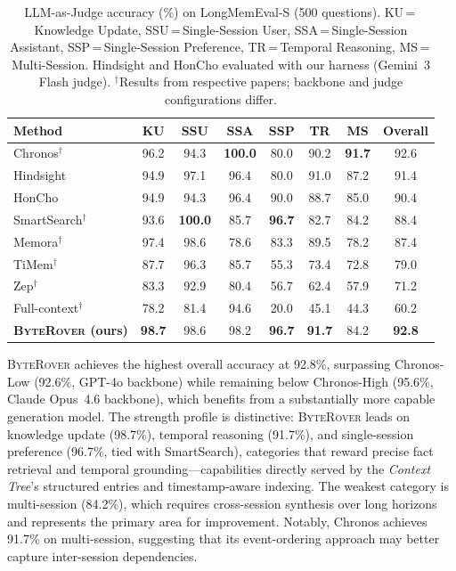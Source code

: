 \documentclass[11pt]{article}
\newcommand{\byterover}{\textsc{ByteRover}}
\newcommand{\contexttree}{\textit{Context Tree}}
\begin{document}
\begin{table}[t]
\centering
\small
\begin{tabular}{@{}lcccccc|c@{}}
\toprule
\textbf{Method} & \textbf{KU} & \textbf{SSU} & \textbf{SSA} & \textbf{SSP} & \textbf{TR} & \textbf{MS} & \textbf{Overall} \\
\midrule
Chronos$^\dagger$       & 96.2 & 94.3 & \textbf{100.0} & 80.0 & 90.2 & \textbf{91.7} & 92.6 \\
Hindsight               & 94.9 & 97.1 & 96.4 & 80.0 & 91.0 & 87.2 & 91.4 \\
HonCho                  & 94.9 & 94.3 & 96.4 & 90.0 & 88.7 & 85.0 & 90.4 \\
SmartSearch$^\dagger$   & 93.6 & \textbf{100.0} & 85.7 & \textbf{96.7} & 82.7 & 84.2 & 88.4 \\
Memora$^\dagger$        & 97.4 & 98.6 & 78.6 & 83.3 & 89.5 & 78.2 & 87.4 \\
TiMem$^\dagger$         & 87.7 & 96.3 & 85.7 & 55.3 & 73.4 & 72.8 & 79.0 \\
Zep$^\dagger$           & 83.3 & 92.9 & 80.4 & 56.7 & 62.4 & 57.9 & 71.2 \\
Full-context$^\dagger$  & 78.2 & 81.4 & 94.6 & 20.0 & 45.1 & 44.3 & 60.2 \\
\midrule
\textbf{\byterover{} (ours)} & \textbf{98.7} & 98.6 & 98.2 & \textbf{96.7} & \textbf{91.7} & 84.2 & \textbf{92.8} \\
\bottomrule
\end{tabular}
\caption{LLM-as-Judge accuracy (\%) on LongMemEval-S (500 questions).
  KU\,=\,Knowledge Update, SSU\,=\,Single-Session User, SSA\,=\,Single-Session Assistant,
  SSP\,=\,Single-Session Preference, TR\,=\,Temporal Reasoning, MS\,=\,Multi-Session.
  Hindsight and HonCho evaluated with our harness (Gemini~3 Flash judge).
  $^\dagger$Results from respective papers; backbone and judge configurations differ.}
\label{tab:longmemeval}
\end{table}

\byterover{} achieves the highest overall accuracy at 92.8\%,
surpassing Chronos-Low (92.6\%, GPT-4o backbone)
while remaining below Chronos-High (95.6\%, Claude Opus~4.6 backbone),
which benefits from a substantially more capable generation model.
The strength profile is distinctive:
\byterover{} leads on knowledge update (98.7\%),
temporal reasoning (91.7\%), and single-session preference
(96.7\%, tied with SmartSearch),
categories that reward precise fact retrieval and temporal grounding---capabilities
directly served by the \contexttree{}'s structured entries
and timestamp-aware indexing.
The weakest category is multi-session (84.2\%),
which requires cross-session synthesis over long horizons
and represents the primary area for improvement.
Notably, Chronos achieves 91.7\% on multi-session,
suggesting that its event-ordering approach
may better capture inter-session dependencies.
\end{document}
